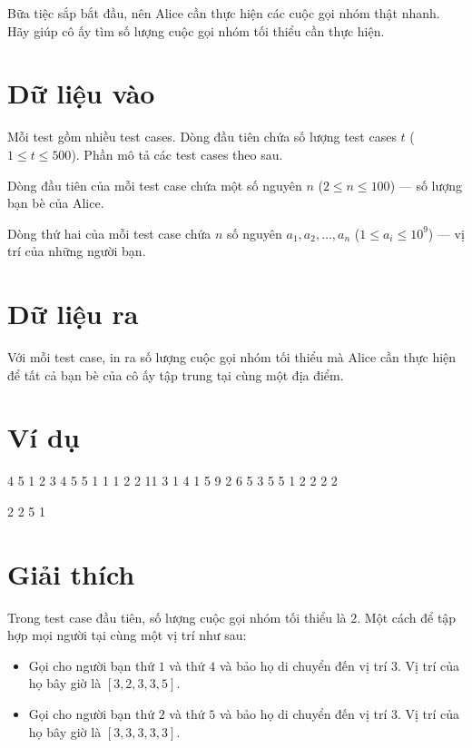 \documentclass[11pt]{article}
\begin{document}
Bữa tiệc sắp bắt đầu, nên Alice cần thực hiện các cuộc gọi nhóm thật nhanh. Hãy giúp cô ấy tìm số lượng cuộc gọi nhóm tối thiểu cần thực hiện.

\section*{Dữ liệu vào}
Mỗi test gồm nhiều test cases. Dòng đầu tiên chứa số lượng test cases $t$ ($1 \le t \le 500$). Phần mô tả các test cases theo sau.

Dòng đầu tiên của mỗi test case chứa một số nguyên $n$ ($2 \le n \le 100$) — số lượng bạn bè của Alice.

Dòng thứ hai của mỗi test case chứa $n$ số nguyên $a_1, a_2, \ldots, a_n$ ($1 \le a_i \le 10^9$) — vị trí của những người bạn.

\section*{Dữ liệu ra}
Với mỗi test case, in ra số lượng cuộc gọi nhóm tối thiểu mà Alice cần thực hiện để tất cả bạn bè của cô ấy tập trung tại cùng một địa điểm.

\section*{Ví dụ}


\begin{inputbox}4
5
1 2 3 4 5
5
1 1 1 2 2
11
3 1 4 1 5 9 2 6 5 3 5
5
1 2 2 2 2
\end{inputbox}
\begin{outputbox}2
2
5
1
\end{outputbox}



\section*{Giải thích}
Trong test case đầu tiên, số lượng cuộc gọi nhóm tối thiểu là $2$. Một cách để tập hợp mọi người tại cùng một vị trí như sau:
\begin{itemize}
    \item Gọi cho người bạn thứ $1$ và thứ $4$ và bảo họ di chuyển đến vị trí $3$. Vị trí của họ bây giờ là $[3, 2, 3, 3, 5]$.
    \item Gọi cho người bạn thứ $2$ và thứ $5$ và bảo họ di chuyển đến vị trí $3$. Vị trí của họ bây giờ là $[3, 3, 3, 3, 3]$.
\end{itemize}
\end{document}
